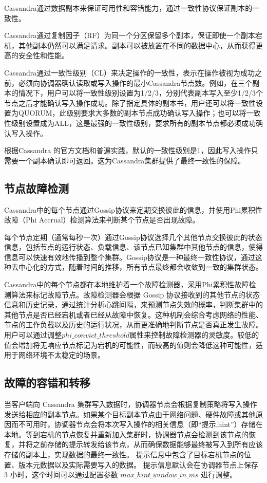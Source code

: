 Cassandra通过数据副本来保证可用性和容错能力，通过一致性协议保证副本的一致性。

Cassandra通过复制因子（RF）为同一个分区保留多个副本，保证即使一个副本宕机，其他副本仍然可以满足请求。副本可以被放置在不同的数据中心，从而获得更高的安全性和性能。

Cassandra通过一致性级别（CL）来决定操作的一致性，表示在操作被视为成功之前，必须向协调器确认读取或写入操作的最小Cassandra节点数。例如，在三个副本的情况下，用户可以将一致性级别设置为1/2/3，分别代表副本写入至少1/2/3个节点之后才能确认写入操作成功。除了指定具体的副本书，用户还可以将一致性设置为QUORUM，此级别要求大多数的副本节点成功确认写入操作；也可以将一致性级别设置成为ALL，这是最强的一致性级别，要求所有的副本节点都必须成功确认写入操作。

根据Cassandra 的官方文档和普遍实践，默认的一致性级别是1，因此写入操作只需要一个副本确认即可返回。这为Cassandra集群提供了最终一致性的保障。

\subsection{节点故障检测}\label{sec:cassandra-failure-detecttion}

Cassandra中的每个节点通过Gossip协议来定期交换彼此的信息，并使用Phi累积性故障（Phi Accrual）检测算法\cite{hayashibara2004spl}来判断某个节点是否出现故障。

每个节点定期（通常每秒一次）通过Gossip协议选择几个其他节点交换彼此的状态信息，包括节点的运行状态、负载信息、该节点已知集群中其他节点的信息，使得信息可以快速有效地传播到整个集群。Gossip协议是一种最终一致性协议，通过这种去中心化的方式，随着时间的推移，所有节点最终都会收敛到一致的集群状态。

Cassandra中的每个节点都在本地维护着一个故障检测器，采用Phi累积性故障检测算法来标记故障节点。故障检测器会根据 Gossip 协议接收到的其他节点的状态信息和历史记录，通过统计分析心跳间隔，来预测节点失效的概率，判断集群中的其他节点是否已经宕机或者已经从故障中恢复。这种机制会综合考虑网络的性能、节点的工作负载以及历史的运行状况，从而更准确地判断节点是否真正发生故障。用户可以通过调整$phi\_convict\_threshold$属性来控制故障检测器的灵敏度。较低的值会增加将无响应节点标记为宕机的可能性，而较高的值则会降低这种可能性，适用于网络环境不太稳定的场景。


\subsection{故障的容错和转移}

当客户端向 Cassandra 集群写入数据时，协调器节点会根据复制策略将写入操作发送给相应的副本节点。如果某个目标副本节点由于网络问题、硬件故障或其他原因而不可用时，协调器节点会将本次写入操作的相关信息（即“提示,hint”）存储在本地。等到宕机的节点恢复并重新加入集群时，协调器节点会检测到该节点的恢复，并将之前存储的提示转发给该节点，从而确保数据能够最终被写入到所有应该存储的副本上，实现数据的最终一致性。
提示信息中包含了目标宕机节点的位置、版本元数据以及实际需要写入的数据。
提示信息默认会在协调器节点上保存 3 小时，这个时间可以通过配置参数 $max\_hint\_window\_in\_ms$ 进行调整。


